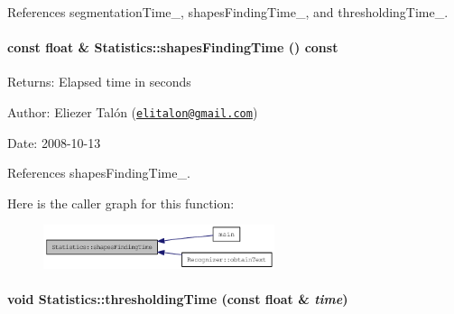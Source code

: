 References segmentationTime\_\-, shapesFindingTime\_\-, and thresholdingTime\_\-.\hypertarget{class_statistics_cdb8852bc99d12a619d130ae2e6948ee}{
\paragraph[{shapesFindingTime}]{\setlength{\rightskip}{0pt plus 5cm}const float \& Statistics::shapesFindingTime () const}\hfill}
\label{class_statistics_cdb8852bc99d12a619d130ae2e6948ee}


\begin{Desc}
\item[Returns:]Elapsed time in seconds\end{Desc}
\begin{Desc}
\item[Author:]Eliezer Talón (\href{mailto:elitalon@gmail.com}{\tt elitalon@gmail.com}) \end{Desc}
\begin{Desc}
\item[Date:]2008-10-13 \end{Desc}


References shapesFindingTime\_\-.

Here is the caller graph for this function:\nopagebreak
\begin{figure}[H]
\begin{center}
\leavevmode
\includegraphics[width=192pt]{class_statistics_cdb8852bc99d12a619d130ae2e6948ee_icgraph}
\end{center}
\end{figure}
\hypertarget{class_statistics_97e33cf2670cb908646fe01b8f1d719a}{
\paragraph[{thresholdingTime}]{\setlength{\rightskip}{0pt plus 5cm}void Statistics::thresholdingTime (const float \& {\em time})}\hfill}
\label{class_statistics_97e33cf2670cb908646fe01b8f1d719a}


